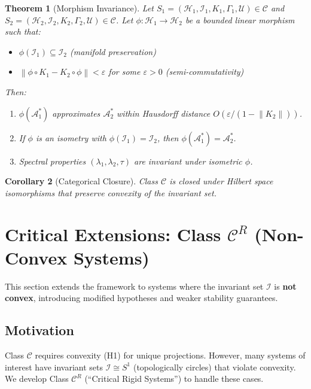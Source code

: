 \documentclass[11pt,a4paper]{article}
\theoremstyle{plain}
\newtheorem{theorem}{Theorem}[section]
\newtheorem{corollary}[theorem]{Corollary}
\theoremstyle{definition}
\newcommand{\Hilb}{\mathcal{H}}
\newcommand{\I}{\mathcal{I}}
\newcommand{\U}{\mathcal{U}}
\newcommand{\A}{\mathcal{A}}
\newcommand{\norm}[1]{\left\lVert #1 \right\rVert}
\begin{document}
\begin{theorem}[Morphism Invariance]\label{thm:morphism}
Let $S_1 = (\Hilb_1, \I_1, K_1, \Gamma_1, \U) \in \mathscr{C}$ and $S_2 = (\Hilb_2, \I_2, K_2, \Gamma_2, \U) \in \mathscr{C}$.
Let $\phi: \Hilb_1 \to \Hilb_2$ be a bounded linear morphism such that:
\begin{itemize}
    \item $\phi(\I_1) \subseteq \I_2$ (manifold preservation)
    \item $\norm{\phi \circ K_1 - K_2 \circ \phi} < \varepsilon$ for some $\varepsilon > 0$ (semi-commutativity)
\end{itemize}
Then:
\begin{enumerate}
    \item $\phi(\A^*_1)$ approximates $\A^*_2$ within Hausdorff distance $O(\varepsilon/(1-\norm{K_2}))$.
    \item If $\phi$ is an isometry with $\phi(\I_1) = \I_2$, then $\phi(\A^*_1) = \A^*_2$.
    \item Spectral properties $(\lambda_1, \lambda_2, \tau)$ are invariant under isometric $\phi$.
\end{enumerate}
\end{theorem}

\begin{corollary}[Categorical Closure]
Class $\mathscr{C}$ is closed under Hilbert space isomorphisms that preserve convexity of the invariant set.
\end{corollary}

\section{Critical Extensions: Class $\mathscr{C}^R$ (Non-Convex Systems)}

This section extends the framework to systems where the invariant set $\I$ is \textbf{not convex}, introducing modified hypotheses and weaker stability guarantees.

\subsection{Motivation}

Class $\mathscr{C}$ requires convexity (H1) for unique projections. However, many systems of interest have invariant sets $\I \cong S^1$ (topologically circles) that violate convexity. We develop Class $\mathscr{C}^R$ (``Critical Rigid Systems'') to handle these cases.
\end{document}
